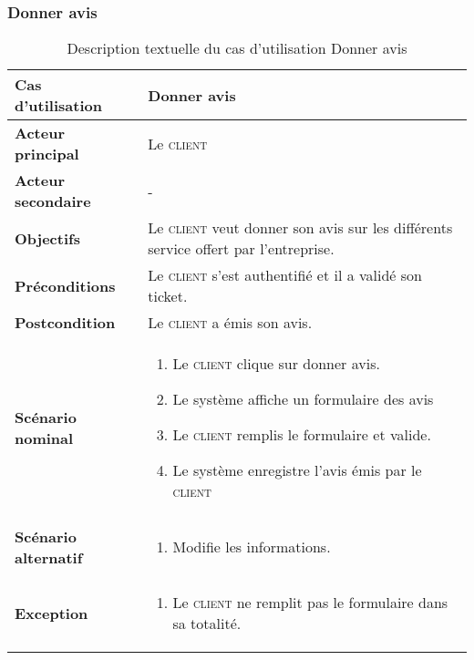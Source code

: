         \subsubsection[Donner avis]{Donner avis}
        \begin{longtable}{p{4cm} p{9cm}}
            \caption{Description textuelle du cas d’utilisation Donner avis}
            \label{table:usecaseDonnerAvis}
            \\\hline\hline
                \textbf{Cas d’utilisation} & \textbf{Donner avis}
            \\\hline\hline
                    \textbf{Acteur principal} & Le \textsc{client}
                \\
                    \textbf{Acteur secondaire} & -
                \\
                    \textbf{Objectifs} & Le \textsc{client} veut donner son avis sur
                    les différents service offert par l’entreprise.
                \\
                    \textbf{Préconditions} & Le \textsc{client} s’est authentifié et
                    il a validé son ticket.
                \\
                    \textbf{Postcondition} & Le \textsc{client} a émis son avis.
                \\
                \textbf{Scénario nominal} &
                    \begin{enumerate}[leftmargin=*]
                        \item Le \textsc{client} clique sur donner avis.
                        \item Le système affiche un formulaire des avis
                        \item Le \textsc{client} remplis le formulaire et valide.
                        \item Le système enregistre l’avis émis par le \textsc{client}
                    \end{enumerate}
                \\
                \textbf{Scénario alternatif} &
                    \begin{enumerate}[leftmargin=*]
                        \item Modifie les informations.
                    \end{enumerate}
                \\
                \textbf{Exception} &
                    \begin{enumerate}[leftmargin=*]
                        \item Le \textsc{client} ne remplit pas le formulaire
                        dans sa totalité.
                    \end{enumerate}
            \\\bottomrule
        \end{longtable}


